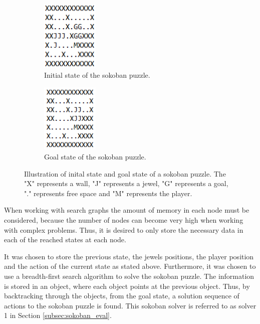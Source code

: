 \documentclass[../report.tex]{subfiles}
\begin{document}
\begin{figure}[H]
    \centering
    \begin{subfigure}{0.49\textwidth}
        \centering
        \includegraphics[width=0.3\textwidth]{figures/solver_design/map5.png}
        \caption{Initial state of the sokoban puzzle.}
        \label{subfig:inital_state}
    \end{subfigure}
    \begin{subfigure}{0.49\textwidth}
        \centering
        \includegraphics[width=0.3\textwidth]{figures/solver_design/goal_state.png}
        \caption{Goal state of the sokoban puzzle.}
        \label{subfig:goal_state}
    \end{subfigure}
    \caption{Illustration of inital state and goal state of a sokoban puzzle. The "X" represents a wall, "J" represents a jewel, "G" represents a goal, "." represents free space and "M" represents the player.}
    \label{fig:inital_goal_state}
\end{figure}

When working with search graphs the amount of memory in each node must be considered, because the number of nodes can become very high when working with complex problems. Thus, it is desired to only store the necessary data in each of the reached states at each node. 

It was chosen to store the previous state, the jewels positions, the player position and the action of the current state as stated above. Furthermore, it was chosen to use a breadth-first search algorithm to solve the sokoban puzzle. The information is stored in an object, where each object points at the previous object. Thus, by backtracking through the objects, from the goal state, a solution sequence of actions to the sokoban puzzle is found. This sokoban solver is referred to as solver 1 in Section \ref{subsec:sokoban_eval}.
\end{document}
